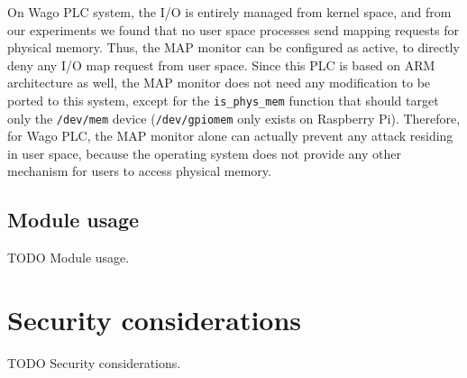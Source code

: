On Wago PLC system, the I/O is entirely managed from kernel space, and from our experiments we found that no user space processes send mapping requests for physical memory.
Thus, the MAP monitor can be configured as active, to directly deny any I/O map request from user space.
Since this PLC is based on ARM architecture as well, the MAP monitor does not need any modification to be ported to this system,
except for the \verb|is_phys_mem| function that should target only the \verb|/dev/mem| device (\verb|/dev/gpiomem| only exists on Raspberry Pi).
Therefore, for Wago PLC, the MAP monitor alone can actually prevent any attack residing in user space, because the operating system does not provide
any other mechanism for users to access physical memory.


\subsection{Module usage}
\label{sec:def_usage}

TODO Module usage.


\section{Security considerations}
\label{sec:def_sec}

TODO Security considerations.
